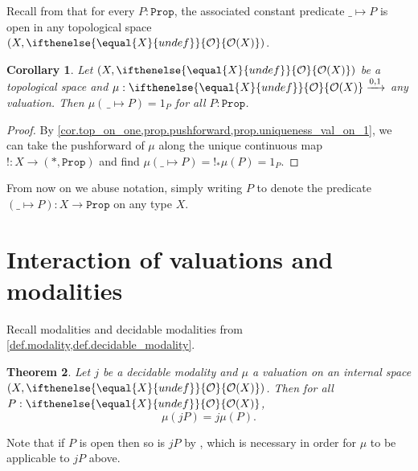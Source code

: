 \documentclass[reqno,11pt]{amsproc}
\theoremstyle{plain}
\newtheorem{theorem}{Theorem}[section]
\newtheorem{corollary}[theorem]{Corollary}
\theoremstyle{definition}
\newcommand{\Const}[1]{\mathtt{#1}}
\renewcommand{\to}[1][]{\xrightarrow{#1}}
\newcommand{\ind}[1]{1_{#1}}			%
\newcommand{\prop}{\Const{Prop}}
\newcommand{\Op}[1][undef]{\ifthenelse{\equal{#1}{undef}}{\mathcal{O}}{\mathcal{O}(#1)}}
\numberwithin{equation}{section}
\begin{document}
Recall from  that for every $P : \prop$, the associated constant predicate $\_ \mapsto P$ is open in any topological space $(X,\Op[X])$. 

\begin{corollary}\label{cor.val_const_indicator}
	Let $(X,\Op[X])$ be a topological space and $\mu : \Op[X] \to [0,1]$ any valuation. Then $\mu(\,\_\mapsto P) = \ind{P}$ for all $P : \prop$.
\end{corollary}

\begin{proof}
	By \cref{cor.top_on_one,prop.pushforward,prop.uniqueness_val_on_1}, we can take the pushforward of $\mu$ along the unique continuous map $!\colon X\to (*,\prop)$ and find $\mu(\_\mapsto P)=!_*\mu(P)=\ind{P}$.
\end{proof}

From now on we abuse notation, simply writing $P$ to denote the predicate $(\_\mapsto P)\colon X\to\prop$ on any type $X$.

\section{Interaction of valuations and modalities}


Recall modalities and decidable modalities from \cref{def.modality,def.decidable_modality}. 
\begin{theorem}
	\label{vals_vs_modalities}
	Let $j$ be a decidable modality and $\mu$ a valuation on an internal space $(X,\Op[X])$. Then for all $P : \Op[X]$,
	\[
		\mu(jP) = j \mu(P).	
	\]
\end{theorem}

Note that if $P$ is open then so is $jP$ by , which is necessary in order for $\mu$ to be applicable to $jP$ above.
\end{document}
